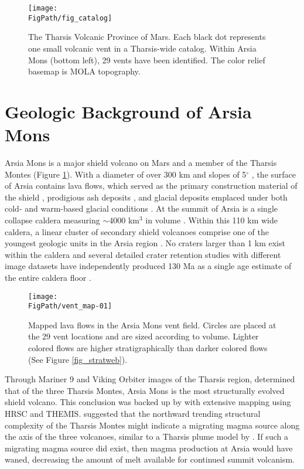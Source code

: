 \begin{figure}
\centering
\texttt{[image: \\FigPath/fig\_catalog]}
\caption[The Tharsis Volcanic Province of Mars]{The Tharsis Volcanic Province of Mars. Each black dot represents one small volcanic vent in a Tharsis-wide catalog. Within Arsia Mons (bottom left), 29 vents have been identified. The color relief basemap is MOLA topography.}
\label{fig_locatormap}
\end{figure}

\section{Geologic Background of Arsia Mons}

Arsia Mons is a major shield volcano on Mars and a member of the Tharsis Montes (Figure \ref{fig_locatormap}). With a diameter of over 300 km and slopes of 5$^{\circ}$ \citep{plescia2004morphometric}, the surface of Arsia contains lava flows, which served as the primary construction material of the shield \citep{mouginis2008lava}, prodigious ash deposits \citep{mouginis2002prodigious}, and glacial deposits \citep{head2003cold} emplaced under both cold- and warm-based glacial conditions \citep{scanlon2015volcanism}. At the summit of Arsia is a single collapse caldera measuring $\sim$4000 km$^3$ in volume \citep{wilson2001evidence}. Within this 110 km wide caldera, a linear cluster of secondary shield volcanoes comprise one of the youngest geologic units in the Arsia region \citep{carr1977some,scott1995geologic}. No craters larger than 1 km exist within the caldera and several detailed crater retention studies with different image datasets have independently produced 130 Ma as a single age estimate of the entire caldera floor \citep{neukum2004recent,werner2009global,robbins2011volcanic}.
\begin{figure}
\centering
\texttt{[image: \\FigPath/vent\_map-01]}
\caption[Mapped lava flows in the Arsia Mons vent field]{Mapped lava flows in the Arsia Mons vent field. Circles are placed at the 29 vent locations and are sized according to volume. Lighter colored flows are higher stratigraphically than darker colored flows (See Figure \ref{fig_stratweb}).}
\label{fig_lavamap}
\end{figure}

Through Mariner 9 and Viking Orbiter images of the Tharsis region, \citet{crumpler1978structural} determined that of the three Tharsis Montes, Arsia Mons is the most structurally evolved shield volcano. This conclusion was backed up by \citet{bleacher2007tharsis} with extensive mapping using HRSC and THEMIS. \citet{bleacher2007tharsis} suggested that the northward trending structural complexity of the Tharsis Montes might indicate a migrating magma source along the axis of the three volcanoes, similar to a Tharsis plume model by \citet{mege1996plume}. If such a migrating magma source did exist, then magma production at Arsia would have waned, decreasing the amount of melt available for continued summit volcanism.

